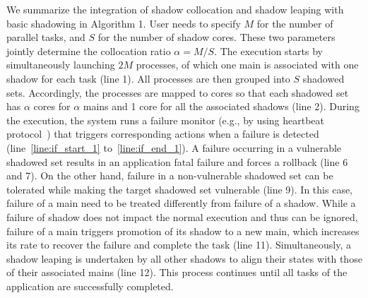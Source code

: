 We summarize the integration of shadow collocation and shadow leaping with basic shadowing in Algorithm 1.
User needs to specify $M$ for the number of parallel tasks, and $S$ for the number of shadow cores. These two parameters jointly determine the collocation ratio $\alpha=M/S$. The execution starts by simultaneously launching $2M$ processes, of which one main is associated with one shadow for each task (line 1). 
All processes are then grouped into $S$ shadowed sets. Accordingly, the processes are mapped to cores so that each shadowed set has $\alpha$ cores for $\alpha$ mains and 1 core for all the associated shadows (line 2). 
During the execution,
the system runs a failure monitor (e.g., by using heartbeat protocol~\cite{1004595}) that triggers corresponding actions when a failure is detected (line~\ref{line:if_start_1} to~\ref{line:if_end_1}). %
A failure occurring in a vulnerable shadowed set results in an application fatal failure %
 and forces a rollback (line 6 and 7).
On the other hand, failure in a non-vulnerable shadowed set
can be tolerated while making the target shadowed set vulnerable (line 9). In this case, failure of a main need to be treated differently from failure of a shadow. While a failure of shadow 
does not impact the normal execution and thus can be ignored, failure of a main %
triggers promotion of its shadow to a new main, which increases its rate to recover the failure and complete the task (line 11). Simultaneously, a shadow leaping is undertaken by all other shadows to align their states with those of their associated mains (line 12).  
This process continues until all tasks of the application are successfully completed.

